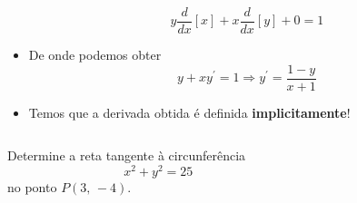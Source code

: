 \begin{frame}
\begin{columns}[onlytextwidth]
\begin{column}{0.49\textwidth}
\begin{itemize}
\begin{equation*}
          y\frac{d}{dx}\left[x\right] + x\frac{d}{dx}\left[y\right] + 0 = 1
        \end{equation*}
        \item De onde podemos obter
        \begin{equation*}
          y + xy^{\prime} = 1 \Rightarrow y^{\prime} = \frac{1-y}{x+1}
        \end{equation*}
        \item Temos que a derivada obtida é definida \textbf{implicitamente}!
      \end{itemize}
    \end{column}
  \end{columns}
\end{frame}

\begin{frame}
  \begin{columns}[onlytextwidth]
    \begin{column}{0.5\textwidth}\vspace*{-0.5cm}
      \begin{example}
        Determine a reta tangente à circunferência
        \begin{equation*}
          x^{2} + y^{2} = 25
        \end{equation*}
        no ponto $P(3,\,-4)$.
      \end{example}
    \end{column}
    \begin{column}{0.5\textwidth}
      \begin{figure}
      \end{figure}
    \end{column}
  \end{columns}
\end{frame}

